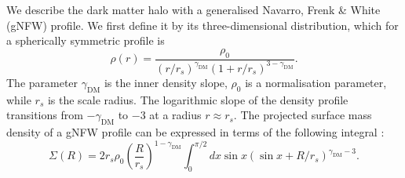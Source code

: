 \documentclass{aa}
\def\reff{R_{\mathrm{e}}}
\def\mstar{M_*}
\def\gammadm{\gamma_{\mathrm{DM}}}
\def\teff{\theta_{\mathrm{e}}}
\def\Sref#1{Section~\ref{#1}\xspace}
\begin{document}


We describe the dark matter halo with a generalised Navarro, Frenk \& White (gNFW) profile.
We first define it by its three-dimensional distribution, which for a spherically symmetric profile is
\begin{equation}
\rho(r) = \dfrac{\rho_0}{(r/r_s)^{\gammadm}\left(1 + r/r_s\right)^{3-\gammadm}}.
\end{equation}
The parameter $\gammadm$ is the inner density slope, $\rho_0$ is a normalisation parameter, while $r_s$ is the scale radius. The logarithmic slope of the density profile transitions from $-\gammadm$ to $-3$ at a radius $r\approx r_s$.
The projected surface mass density of a gNFW profile can be expressed in terms of the following integral \citep{WTS01}:
\begin{equation}
\Sigma(R) = 2r_s\rho_0 \left(\frac{R}{r_s}\right)^{1-\gammadm}\int_0^{\pi/2} dx \sin{x}(\sin{x} + R/r_s)^{\gammadm-3}.
\end{equation}
\end{document}
